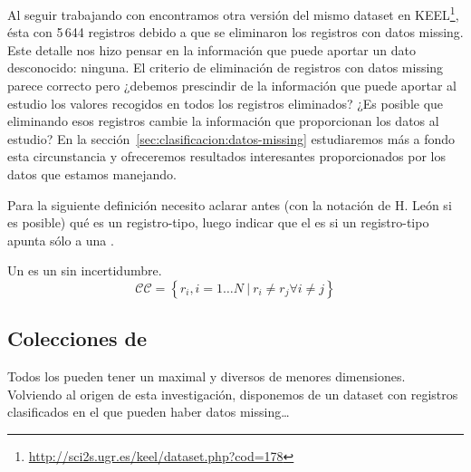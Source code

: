 Al seguir trabajando con \mushroom encontramos otra versión del mismo dataset en KEEL\footnote{\url{http://sci2s.ugr.es/keel/dataset.php?cod=178}}, ésta con 5\,644 registros debido a que se eliminaron los registros con datos missing. Este detalle nos hizo pensar en la información que puede aportar un dato desconocido: ninguna. El criterio de eliminación de registros con datos missing parece correcto pero ¿debemos prescindir de la información que puede aportar al estudio los valores recogidos en todos los registros eliminados? ¿Es posible que eliminando esos registros cambie la información que proporcionan los datos al estudio? En la sección~\ref{sec:clasificacion:datos-missing} estudiaremos más a fondo esta circunstancia y ofreceremos resultados interesantes proporcionados por los datos que estamos manejando.



Para la siguiente definición necesito aclarar antes (con la notación de H. León si es posible) qué es un registro-tipo, luego indicar que el \catalogo es \CC si un registro-tipo apunta sólo a una \clase.

\begin{Definition}[\CC] Un \CC es un \catalogo sin incertidumbre.
   $$\mathcal{CC} = \left\{r_i, i = 1\ldots N\ | \ r_i \neq r_j \forall i \neq j\right\}$$
\label{def:catalogo-completo}
\end{Definition}








\subsection{Colecciones de \CCs}
\label{sec:clasificacion:catalogo-completo:colecciones}
%

Todos los \CCs pueden tener un \CC maximal y diversos \CCs de menores dimensiones. Volviendo al origen de esta investigación, disponemos de un dataset con registros clasificados en el que pueden haber datos missing\ldots 
